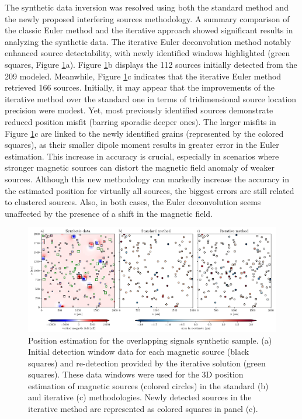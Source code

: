 The synthetic data inversion was resolved using both the standard method \citep{Souza-Junior2024} and the newly proposed interfering sources methodology. A summary comparison of the classic Euler method and the iterative approach showed significant results in analyzing the synthetic data. The iterative Euler deconvolution method notably enhanced source detectability, with newly identified windows highlighted (green squares, Figure \ref{euler2}a). Figure \ref{euler2}b displays the 112 sources initially detected from the 209 modeled. Meanwhile, Figure \ref{euler2}c indicates that the iterative Euler method retrieved 166 sources. Initially, it may appear that the improvements of the iterative method  over the standard one in terms of tridimensional source location precision were modest. Yet, most previously identified sources demonstrate reduced position misfit (barring sporadic deeper ones). The larger misfits in Figure \ref{euler2}c are linked to the newly identified grains (represented by the colored squares), as their smaller dipole moment results in greater error in the Euler estimation. This increase in accuracy is crucial, especially in scenarios where stronger magnetic sources can distort the magnetic field anomaly of weaker sources. Although this new methodology can markedly increase the accuracy in the estimated position for virtually all sources, the biggest errors are still related to clustered sources. Also, in both cases, the Euler deconvolution seems unaffected by the presence of a shift in the magnetic field.


\begin{figure}[tb!]
  \centering
  \includegraphics[width=1\linewidth]{micromag-interfering-sources/figures/euler-comparion-synthetic.png}
  \caption{
    Position estimation for the overlapping signals synthetic sample. (a) Initial detection window data for each magnetic source (black squares) and re-detection provided by the iterative solution (green squares). These data windows were used for the 3D position estimation of magnetic sources (colored circles) in the standard (b) and iterative (c) methodologies. Newly detected sources in the iterative method are represented as colored squares in panel (c).
  }
  \label{euler2}
\end{figure}

